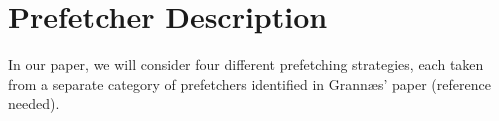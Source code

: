 
\section{Prefetcher Description}
\label{sec:prefetcherDescription}

In our paper, we will consider four different prefetching strategies,
each taken from a separate category of prefetchers identified in
Grannæs' paper (reference needed). 





